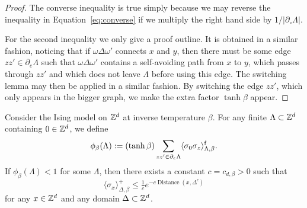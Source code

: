 \begin{proof}
    The converse inequality is true simply because we may reverse the inequality in
    Equation~\eqref{eq:converse} if we multiply the right hand side by $1/|\partial_\circ\Lambda|$.

    For the second inequality we only give a proof outline.
    It is obtained in a similar fashion,
    noticing that if $\omega\Delta\omega'$ connects
    $x$ and $y$,
    then there must be some edge $zz'\in\partial_e\Lambda$
    such that $\omega\Delta\omega'$ contains a self-avoiding path
    from $x$ to $y$, which passes through $zz'$
    and which does not leave $\Lambda$ before using this edge.
    The switching lemma may then be applied in a similar fashion.
    By switching the edge $zz'$, which only appears in the bigger
    graph,
    we make the extra factor $\tanh\beta$ appear.
\end{proof}

\begin{corollary}
    Consider the Ising model on $\mathbb Z^d$ at inverse temperature $\beta$.
    For any finite $\Lambda\subset\mathbb Z^d$ containing $0\in\mathbb Z^d$,
    we define
    \[
        \phi_\beta(\Lambda):=
        (\tanh\beta)
        \sum_{zz'\in\partial_e\Lambda}
        \langle\sigma_0\sigma_z\rangle_{\Lambda,\beta}^{\operatorname{f}}.
    \]
    If $\phi_\beta(\Lambda)<1$ for some $\Lambda$, then
    there exists a constant $c=c_{d,\beta}>0$
    such that
    \[
        \langle\sigma_x\rangle_{\Delta,\beta}^+
        \leq \tfrac1ce^{-c \operatorname{Distance}(x,\Delta^c)}
    \]
    for any $x\in\mathbb Z^d$ and any domain $\Delta\subset\mathbb Z^d$.
\end{corollary}

